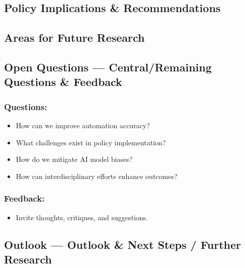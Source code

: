 \documentclass[
  letterpaper,
]{book}
\providecommand{\tightlist}{%
  \setlength{\itemsep}{0pt}\setlength{\parskip}{0pt}}
\begin{document}
\subsection{Policy Implications \&
Recommendations}\label{policy-implications-recommendations}

\subsection{Areas for Future Research}\label{areas-for-future-research}

\subsection{Open Questions --- Central/Remaining Questions \&
Feedback}\label{open-questions-centralremaining-questions-feedback}

\subsubsection{Questions:}\label{questions}

\begin{itemize}
\tightlist
\item
  How can we improve automation accuracy?\\
\item
  What challenges exist in policy implementation?\\
\item
  How do we mitigate AI model biases?\\
\item
  How can interdisciplinary efforts enhance outcomes?
\end{itemize}

\subsubsection{Feedback:}\label{feedback}

\begin{itemize}
\tightlist
\item
  Invite thoughts, critiques, and suggestions.
\end{itemize}

\subsection{Outlook --- Outlook \& Next Steps / Further
Research}\label{outlook-outlook-next-steps-further-research-1}
\end{document}

